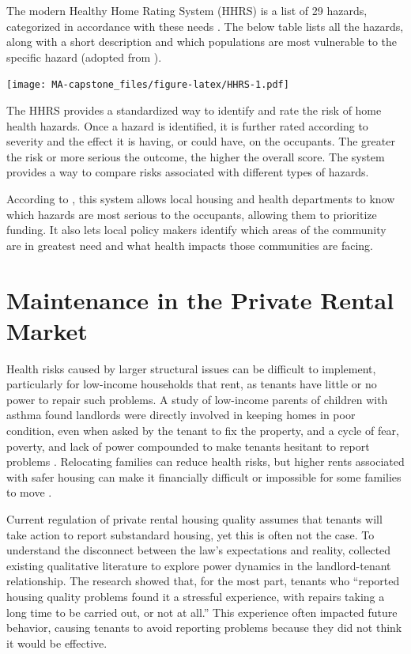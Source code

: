 \documentclass[
]{book}
\begin{document}
The modern Healthy Home Rating System (HHRS) is a list of 29 hazards, categorized in accordance with these needs \citep[ 2]{HHRSover}. The below table lists all the hazards, along with a short description and which populations are most vulnerable to the specific hazard (adopted from \citet{HHRSlst}).

\texttt{[image: MA-capstone\_files/figure-latex/HHRS-1.pdf]}

The HHRS provides a standardized way to identify and rate the risk of home health hazards. Once a hazard is identified, it is further rated according to severity and the effect it is having, or could have, on the occupants. The greater the risk or more serious the outcome, the higher the overall score. The system provides a way to compare risks associated with different types of hazards.

According to \citet{HHRSover}, this system allows local housing and health departments to know which hazards are most serious to the occupants, allowing them to prioritize funding. It also lets local policy makers identify which areas of the community are in greatest need and what health impacts those communities are facing.

\hypertarget{maintenance-in-the-private-rental-market}{%
\section{Maintenance in the Private Rental Market}\label{maintenance-in-the-private-rental-market}}

Health risks caused by larger structural issues can be difficult to implement, particularly for low-income households that rent, as tenants have little or no power to repair such problems. A study of low-income parents of children with asthma found landlords were directly involved in keeping homes in poor condition, even when asked by the tenant to fix the property, and a cycle of fear, poverty, and lack of power compounded to make tenants hesitant to report problems \citep{grineski2010}. Relocating families can reduce health risks, but higher rents associated with safer housing can make it financially difficult or impossible for some families to move \citep{mclaine2006}.

Current regulation of private rental housing quality assumes that tenants will take action to report substandard housing, yet this is often not the case. To understand the disconnect between the law's expectations and reality, \citet{chisholm2018} collected existing qualitative literature to explore power dynamics in the landlord-tenant relationship. The research showed that, for the most part, tenants who ``reported housing quality problems found it a stressful experience, with repairs taking a long time to be carried out, or not at all.'' This experience often impacted future behavior, causing tenants to avoid reporting problems because they did not think it would be effective.
\end{document}
